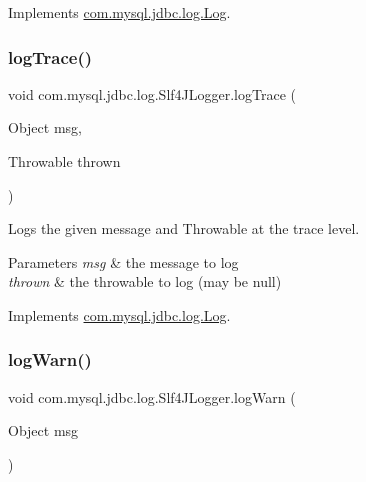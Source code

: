 Implements \mbox{\hyperlink{interfacecom_1_1mysql_1_1jdbc_1_1log_1_1_log_a8946382e4cf99819a43cdb3783fd0ee3}{com.\+mysql.\+jdbc.\+log.\+Log}}.

\mbox{\label{classcom_1_1mysql_1_1jdbc_1_1log_1_1_slf4_j_logger_ac0e1bf43fefe1495aba1042cf46c1e0c}} 
\subsubsection{\texorpdfstring{log\+Trace()}{logTrace()}\hspace{0.1cm}{\footnotesize\ttfamily [2/2]}}
{\footnotesize\ttfamily void com.\+mysql.\+jdbc.\+log.\+Slf4\+J\+Logger.\+log\+Trace (\begin{DoxyParamCaption}\item[{Object}]{msg,  }\item[{Throwable}]{thrown }\end{DoxyParamCaption})}

Logs the given message and Throwable at the \textquotesingle{}trace\textquotesingle{} level.


\begin{DoxyParams}{Parameters}
{\em msg} & the message to log \\
\hline
{\em thrown} & the throwable to log (may be null) \\
\hline
\end{DoxyParams}


Implements \mbox{\hyperlink{interfacecom_1_1mysql_1_1jdbc_1_1log_1_1_log_a99ab17ccd9795acda736a284d9e32024}{com.\+mysql.\+jdbc.\+log.\+Log}}.

\mbox{\label{classcom_1_1mysql_1_1jdbc_1_1log_1_1_slf4_j_logger_a8b048f288f99466e1c687c84a472dca2}} 
\subsubsection{\texorpdfstring{log\+Warn()}{logWarn()}\hspace{0.1cm}{\footnotesize\ttfamily [1/2]}}
{\footnotesize\ttfamily void com.\+mysql.\+jdbc.\+log.\+Slf4\+J\+Logger.\+log\+Warn (\begin{DoxyParamCaption}\item[{Object}]{msg }\end{DoxyParamCaption})}

